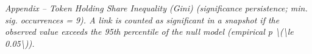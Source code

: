 \begin{table}[!ht]
\centering
\small
{}
\vspace{2mm}\textit{Appendix – Token Holding Share Inequality (Gini) (significance persistence; min. sig. occurrences = 9). A link is counted as significant in a snapshot if the observed value exceeds the 95th percentile of the null model (empirical p \textbackslash{}(\textbackslash{}le 0.05\textbackslash{})).}
\end{table}